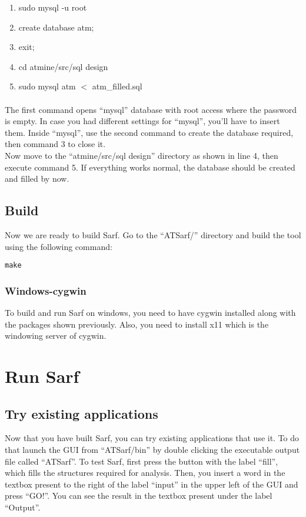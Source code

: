 \documentclass{article}
\begin{document}
\begin{enumerate}
\item sudo mysql -u root
\item create database atm;
\item exit;
\item cd atmine/src/sql design
\item sudo mysql atm $<$ atm\_filled.sql
\end{enumerate}

\paragraph{}
The first command opens ``mysql'' database with root access where the password is empty. In case you had different settings for ``mysql'', you'll have to insert them. Inside ``mysql'', use the second command to create the database required, then command 3 to close it.\\
Now move to the ``atmine/src/sql design'' directory as shown in line 4, then execute command 5. If everything works normal, the database should be created and filled by now.

\subsection{Build}
Now we are ready to build Sarf.
Go to the ``ATSarf/'' directory and build the tool using the following command:
\begin{verbatim}
make
\end{verbatim}

\subsubsection{Windows-cygwin}

To build and run Sarf on windows, you need to have cygwin installed along with the packages shown previously. Also, you need to install x11 which is the windowing server of cygwin.

\section{Run Sarf}

\subsection{Try existing applications}
Now that you have built Sarf, you can try existing applications that use it. To do that launch the GUI from ``ATSarf/bin'' by double clicking the executable output file called ``ATSarf''.
To test Sarf, first press the button with the label ``fill'', which fills the structures required for analysis. Then, you insert a word in the textbox present to the right of the label ``input'' in the upper left of the GUI and press ``GO!''. You can see the result in the textbox present under the label ``Output''.
\end{document}
